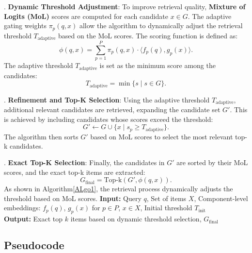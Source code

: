. \textbf{Dynamic Threshold Adjustment}:  
To improve retrieval quality, \textbf{Mixture of Logits (MoL)} scores are computed for each candidate \(x \in G\). The adaptive gating weights \(\pi_p(q, x)\) allow the algorithm to dynamically adjust the retrieval threshold \(T_{\text{adaptive}}\) based on the MoL scores. The scoring function is defined as:
\begin{equation}
	\phi(q, x) = \sum_{p=1}^{P} \pi_p(q, x) \cdot \langle f_p(q), g_p(x) \rangle.
	\label{similarity_function}
\end{equation}
The adaptive threshold \(T_{\text{adaptive}}\) is set as the minimum score among the candidates:
\begin{equation}
	T_{\text{adaptive}} = \min\{s \mid s \in G\}.
\end{equation}

. \textbf{Refinement and Top-K Selection}:  
Using the adaptive threshold \(T_{\text{adaptive}}\), additional relevant candidates are retrieved, expanding the candidate set \(G'\). This is achieved by including candidates whose scores exceed the threshold:
\begin{equation}
	G' \leftarrow G \cup \{x \mid s_p \geq T_{\text{adaptive}}\}.
\end{equation}
The algorithm then sorts \(G'\) based on MoL scores to select the most relevant top-k candidates.

. \textbf{Exact Top-K Selection}:  
Finally, the candidates in \(G'\) are sorted by their MoL scores, and the exact top-k items are extracted:
\begin{equation}
	G_{\text{final}} = \text{Top-k}(G', \phi(q, x)).
\end{equation}
As shown in Algorithm\ref{ALgo1}, the retrieval process dynamically adjusts the threshold based on MoL scores.
\textbf{Input:} Query $q$, Set of items $X$, Component-level embeddings: $f_p(q)$, $g_p(x)$ for $p \in P$, $x \in X$, Initial threshold $T_{\text{init}}$ \\
\textbf{Output:} Exact top $k$ items based on dynamic threshold selection, $G_{\text{final}}$ \\


\subsection{Pseudocode}



